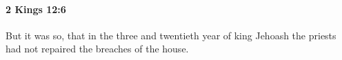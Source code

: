 
		\paragraph{2 Kings 12:6} %
			\label{2KINGS-12-6}

			But it was so, that in the three and twentieth year of king Jehoash the priests had not repaired the breaches of the house.


